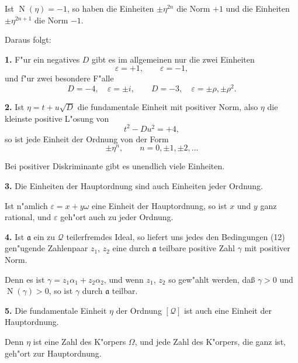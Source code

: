 \documentclass[11pt,a4paper]{article}
\theoremstyle{plain}
\DeclareMathOperator{\Norm}{N}
\begin{document}
Ist $\Norm(\eta) = -1$, so haben die Einheiten $\pm\eta^{2n}$ die Norm $+1$ und die Einheiten $\pm\eta^{2n+1}$ die Norm $-1$.

\newpage
\setcounter{page}{399}

Daraus folgt:

\smallskip

\textbf{1.} F"{u}r ein negatives $D$ gibt es im allgemeinen nur die zwei Einheiten
\[
\varepsilon = +1, \qquad \varepsilon = -1,
\]
und f"{u}r zwei besondere F"{a}lle
\[
D = -4, \quad \varepsilon = \pm i, \qquad D = -3, \quad \varepsilon = \pm\rho, \pm\rho^2.
\]

\smallskip

\textbf{2.} Ist $\eta = t + u\sqrt{D}$ die fundamentale Einheit mit positiver Norm, also $\eta$ die kleinste positive L"{o}sung von
\begin{equation}
\label{eq:110_3}
t^2 - Du^2 = +4,
\end{equation}
so ist jede Einheit der Ordnung von der Form
\[
\pm \eta^n, \qquad n = 0, \pm 1, \pm 2, \dots
\]

Bei positiver Diskriminante gibt es unendlich viele Einheiten.

\smallskip

\textbf{3.} Die Einheiten der Hauptordnung sind auch Einheiten jeder Ordnung.

Ist n"{a}mlich $\varepsilon = x + y\omega$ eine Einheit der Hauptordnung, so ist $x$ und $y$ ganz rational, und $\varepsilon$ geh"{o}rt auch zu jeder Ordnung.

\smallskip

\textbf{4.} Ist $\mathfrak{a}$ ein zu $\mathcal{Q}$ teilerfremdes Ideal, so liefert uns jedes den Bedingungen (12) gen"{u}gende Zahlenpaar $z_1$, $z_2$ eine durch $\mathfrak{a}$ teilbare positive Zahl $\gamma$ mit positiver Norm.

Denn es ist $\gamma = z_1\alpha_1 + z_2\alpha_2$, und wenn $z_1$, $z_2$ so gew"{a}hlt werden, da\ss{} $\gamma > 0$ und $\Norm(\gamma) > 0$, so ist $\gamma$ durch $\mathfrak{a}$ teilbar.

\newpage
\setcounter{page}{400}

\smallskip

\textbf{5.} Die fundamentale Einheit $\eta$ der Ordnung $[\mathcal{Q}]$ ist auch eine Einheit der Hauptordnung.

Denn $\eta$ ist eine Zahl des K"{o}rpers $\Omega$, und jede Zahl des K"{o}rpers, die ganz ist, geh"{o}rt zur Hauptordnung.

\smallskip
\end{document}
